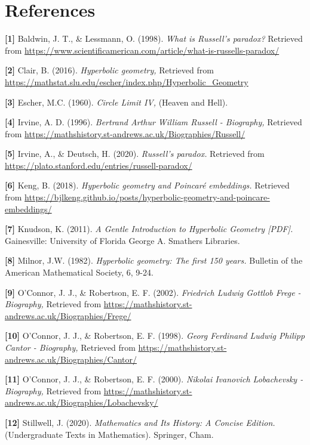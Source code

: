 \documentclass[12pt]{article}
\begin{document}
\section{References}

\textbf{[1]} 
Baldwin, J. T., \& Lessmann, O. (1998). \textit{What is Russell's paradox?} Retrieved from \url{https://www.scientificamerican.com/article/what-is-russells-paradox/}

\textbf{[2]} 
Clair, B. (2016). \textit{Hyperbolic geometry,} Retrieved from \url{https://mathstat.slu.edu/escher/index.php/Hyperbolic_Geometry}

\textbf{[3]} 
Escher, M.C. (1960). \textit{Circle Limit IV,} (Heaven and Hell).

\textbf{[4]} 
Irvine, A. D. (1996). \textit{Bertrand Arthur William Russell - Biography,} Retrieved from \url{https://mathshistory.st-andrews.ac.uk/Biographies/Russell/}

\textbf{[5]} 
Irvine, A., \& Deutsch, H. (2020). \textit{Russell's paradox.} Retrieved from \url{https://plato.stanford.edu/entries/russell-paradox/}

\textbf{[6]} 
Keng, B. (2018). \textit{Hyperbolic geometry and Poincaré embeddings.} Retrieved from \url{https://bjlkeng.github.io/posts/hyperbolic-geometry-and-poincare-embeddings/}

\textbf{[7]} 
Knudson, K. (2011). \textit{A Gentle Introduction to Hyperbolic Geometry [PDF].} Gainesville: University of Florida George A. Smathers Libraries.

\textbf{[8]} 
Milnor, J.W. (1982). \textit{Hyperbolic geometry: The first 150 years.} Bulletin of the American Mathematical Society, 6, 9-24.

\textbf{[9]} 
O'Connor, J. J., \& Robertson, E. F. (2002). \textit{Friedrich Ludwig Gottlob Frege - Biography,} Retrieved from \url{https://mathshistory.st-andrews.ac.uk/Biographies/Frege/}

\textbf{[10]} 
O'Connor, J. J., \& Robertson, E. F. (1998). \textit{Georg Ferdinand Ludwig Philipp Cantor - Biography,} Retrieved from \url{https://mathshistory.st-andrews.ac.uk/Biographies/Cantor/}

\textbf{[11]} 
O'Connor, J. J., \& Robertson, E. F. (2000). \textit{Nikolai Ivanovich Lobachevsky - Biography,} Retrieved from \url{https://mathshistory.st-andrews.ac.uk/Biographies/Lobachevsky/}

\textbf{[12]} 
Stillwell, J. (2020). \textit{Mathematics and Its History: A Concise Edition.} (Undergraduate Texts in Mathematics). Springer, Cham.
\end{document}
